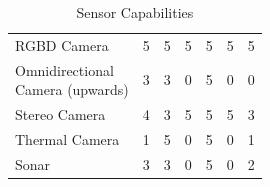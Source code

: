 \documentclass{article}
\begin{document}
\begin{table}[H]
\begin{adjustwidth}{-1.5in}{-1.5in}
\begin{tabular}{|l|c|c|c|c|c|c|}
		\multicolumn{1}{|l|}{\cellcolor{badhighlight!70}RGBD Camera }& \multicolumn{1}{c|}{\cellcolor{badhighlight!70} 5} & \multicolumn{1}{c|}{\cellcolor{badhighlight!70} 5 } & \multicolumn{1}{c|}{\cellcolor{badhighlight!70}5 } & \multicolumn{1}{c|}{\cellcolor{badhighlight!70}5 }   & \multicolumn{1}{c|}{\cellcolor{badhighlight!70}5 } & \multicolumn{1}{c|}{\cellcolor{badhighlight!70}5 } \\ \hdashline
		\makecell[l]{Omnidirectional \\ Camera (upwards)}            & 3                         & 3                          & 0                       & 5                              & 0                        & 0                    \\ \hdashline
		Stereo Camera                                                & 4                         & 3                          & 5                       & 5                              & 5                        & 3                    \\ \hdashline
		Thermal Camera                                               & 1                         & 5                          & 0                       & 5                              & 0                        & 1                    \\ \hdashline
		Sonar                                                        & 3                         & 3                          & 0                       & 5                              & 0                        & 2                   \\ \hline		
		\end{tabular}
		\caption{Sensor Capabilities}
		\label{my-label}
		\end{adjustwidth}
		\end{table}
		
\end{document}
